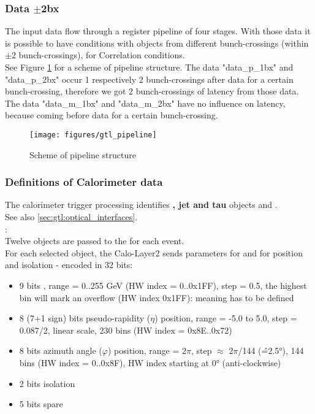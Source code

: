 \subsubsection{Data $\pm$2bx}
\label{sec:gtl:data_p_m_2bx}

The \ugtl input data flow through a register pipeline of four stages. With those data it is possible to have conditions with objects from
different bunch-crossings (within $\pm$2 bunch-crossings), \egamma for Correlation conditions.\\
See Figure \ref{fig:gtl:gtl_pipeline} for a scheme of \ugtl pipeline structure. The data "data\_p\_1bx" and "data\_p\_2bx" occur 1 respectively 2 bunch-crossings
after data for a certain bunch-crossing, therefore we got 2 bunch-crossings of latency from those data. The data "data\_m\_1bx" and "data\_m\_2bx" have no influence
on latency, because coming before data for a certain bunch-crossing.

\begin{figure}[htb]
\centering
\texttt{[image: figures/gtl\_pipeline]}
\caption{Scheme of \ugtl pipeline structure}
\label{fig:gtl:gtl_pipeline}
\end{figure}


\subsubsection{Definitions of Calorimeter data}
\label{sec:gtl:calorimeter_data}

The calorimeter trigger processing identifies \textbf{\egamma, jet and tau} objects and \textbf{\esums}.\\
See also \ref{sec:gtl:optical_interfaces}.\\

\textbf{\egamma}:\\ Twelve objects are passed to the \ugt for each event.\\
For each selected object, the Calo-Layer2 sends parameters for \pt and for position and isolation - encoded in 32 bits:
\begin{itemize}
\item 9 bits \pt, range = 0..255 GeV (HW index = 0..0x1FF), step = 0.5, the highest bin will mark an overflow (HW index 0x1FF): meaning has to be defined
\item 8 (7+1 sign) bits pseudo-rapidity ($\eta$) position, range = -5.0 to 5.0, step = 0.087/2, linear scale, 230 bins (HW index = 0x8E..0x72)
\item 8 bits azimuth angle ($\varphi$) position, range = 2$\pi$, step $\approx$ 2$\pi$/144 (\^=2.5°), 144 bins (HW index = 0..0x8F), HW index starting at 0° (anti-clockwise)
\item 2 bits isolation
\item 5 bits spare
\end{itemize}

